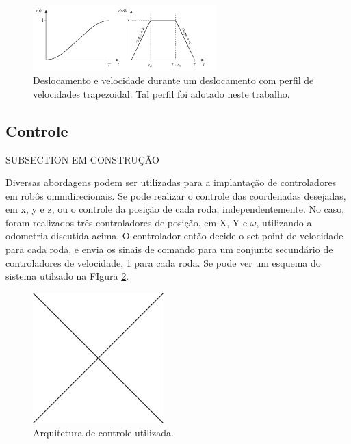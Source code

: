 \begin{figure}[h]
  \centering
  \includegraphics[width = 0.63\textwidth]{imagens/trapezoidal}
  \caption{Deslocamento e velocidade durante um deslocamento com perfil de velocidades trapezoidal. Tal perfil foi adotado neste trabalho.}
  \label{fig:trap}
\end{figure}

\subsection{Controle}

SUBSECTION EM CONSTRUÇÃO

Diversas abordagens podem ser utilizadas para a implantação de controladores em robôs omnidirecionais. Se pode realizar o controle das coordenadas desejadas, em x, y e z, ou o controle da posição de cada roda, independentemente. No caso, foram realizados três controladores de posição, em X, Y e $\omega$, utilizando a odometria discutida acima. O controlador então decide o set point de velocidade para cada roda, e envia os sinais de comando para um conjunto secundário de controladores de velocidade, 1 para cada roda. Se pode ver um esquema do sistema utilzado na FIgura \ref{fig:controle}.

\begin{figure}[h]
  \centering
  \includegraphics[width = 0.45\textwidth]{imagens/edc}
  \caption{Arquitetura de controle utilizada.}
  \label{fig:controle}
\end{figure}

